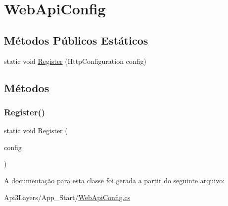 \hypertarget{classApi3Layers_1_1WebApiConfig}{}\section{Web\+Api\+Config}
\label{classApi3Layers_1_1WebApiConfig}
\subsection*{Métodos Públicos Estáticos}
\begin{DoxyCompactItemize}
\item 
static void \hyperlink{classApi3Layers_1_1WebApiConfig_a8941f9a1c4d63842b463068258264cf4}{Register} (Http\+Configuration config)
\end{DoxyCompactItemize}


\subsection{Métodos}
\mbox{\label{classApi3Layers_1_1WebApiConfig_a8941f9a1c4d63842b463068258264cf4}} 
\subsubsection{\texorpdfstring{Register()}{Register()}}
{\footnotesize\ttfamily static void Register (\begin{DoxyParamCaption}\item[{Http\+Configuration}]{config }\end{DoxyParamCaption})\hspace{0.3cm}{\ttfamily [static]}}



A documentação para esta classe foi gerada a partir do seguinte arquivo\+:\begin{DoxyCompactItemize}
\item 
Api3\+Layers/\+App\+\_\+\+Start/\hyperlink{WebApiConfig_8cs}{Web\+Api\+Config.\+cs}\end{DoxyCompactItemize}
